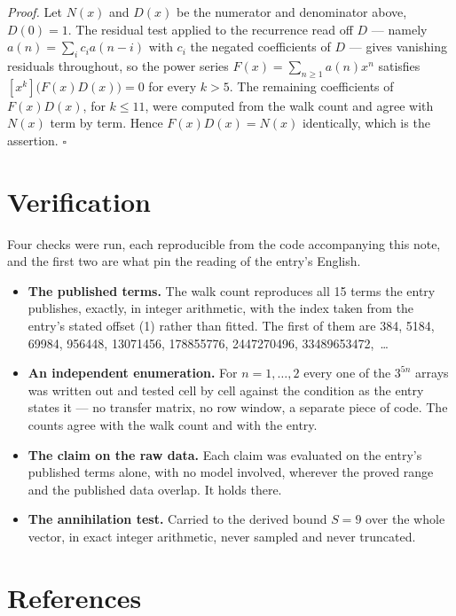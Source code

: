 \documentclass[11pt]{article}
\theoremstyle{definition}
\begin{document}
{\itshape Proof.} Let $N(x)$ and $D(x)$ be the numerator and denominator above, $D(0)=1$. The residual test applied to the recurrence read off $D$ --- namely $a(n) = \sum_i c_i a(n-i)$ with $c_i$ the negated coefficients of $D$ --- gives vanishing residuals throughout, so the power series $F(x)=\sum_{n\ge 1}a(n)x^n$ satisfies $[x^k]\bigl(F(x)D(x)\bigr) = 0$ for every $k > 5$. The remaining coefficients of $F(x)D(x)$, for $k \le 11$, were computed from the walk count and agree with $N(x)$ term by term. Hence $F(x)D(x) = N(x)$ identically, which is the assertion. $\square$

\section{Verification}

Four checks were run, each reproducible from the code accompanying this note, and the first two are what pin the reading of the entry's English.

\begin{itemize}

\item {\bfseries The published terms.} The walk count reproduces all 15 terms the entry publishes, exactly, in integer arithmetic, with the index taken from the entry's stated offset (1) rather than fitted. The first of them are 384, 5184, 69984, 956448, 13071456, 178855776, 2447270496, 33489653472,~\dots

\item {\bfseries An independent enumeration.} For $n = 1,\dots,2$ every one of the $3^{5n}$ arrays was written out and tested cell by cell against the condition as the entry states it --- no transfer matrix, no row window, a separate piece of code. The counts agree with the walk count and with the entry.

\item {\bfseries The claim on the raw data.} Each claim was evaluated on the entry's published terms alone, with no model involved, wherever the proved range and the published data overlap. It holds there.

\item {\bfseries The annihilation test.} Carried to the derived bound $S = 9$ over the whole vector, in exact integer arithmetic, never sampled and never truncated.

\end{itemize}

\section{References}
\end{document}
